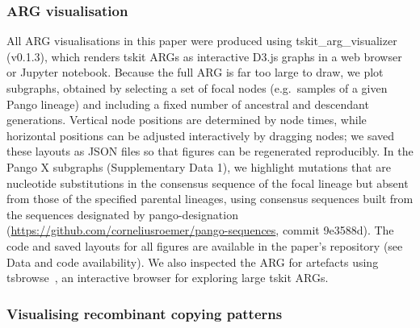 \documentclass[12pt]{article}
\begin{document}
\subsubsection*{ARG visualisation}
All ARG visualisations in this paper were produced using
tskit\_arg\_visualizer~\cite{Kitchens2025tskit} (v0.1.3), which renders
tskit ARGs as interactive D3.js graphs in a web browser or Jupyter notebook.
Because the full ARG is far too large to draw, we plot subgraphs, obtained by
selecting a set of focal nodes (e.g.\ samples of a given Pango lineage) and
including a fixed number of ancestral and descendant generations.
Vertical node positions are determined by node times, while horizontal
positions can be adjusted interactively by dragging nodes; we saved these
layouts as JSON files so that figures can be regenerated reproducibly.
In the Pango X subgraphs (Supplementary Data 1), we highlight mutations
that are nucleotide substitutions in the consensus sequence of the focal
lineage but absent from those of the specified parental lineages,
using consensus sequences built from the
sequences designated by pango-designation
(\url{https://github.com/corneliusroemer/pango-sequences}, commit 9e3588d).
The code and saved layouts for all
figures are available in the paper's repository
(see Data and code availability).
We also inspected the ARG for artefacts
using tsbrowse~\cite{Karthikeyan2025tsbrowse}, an interactive browser
for exploring large tskit ARGs.

\subsubsection*{Visualising recombinant copying patterns}
\end{document}
